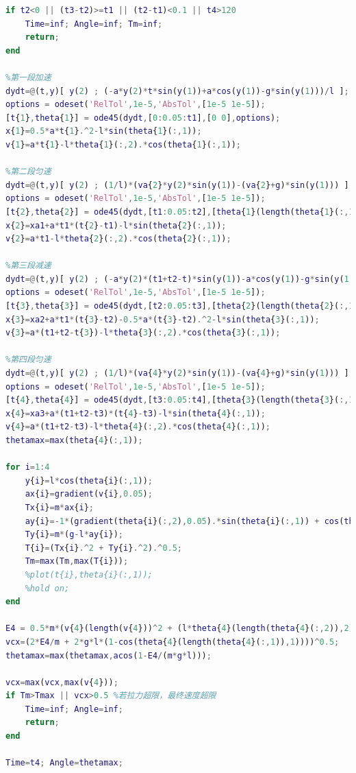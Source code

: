 \documentclass[withoutpreface,bwprint]{cumcmthesis} %
\begin{document}
\begin{appendices}
\begin{lstlisting}[language=matlab]
if t2<0 || (t3-t2)>=t1 || (t2-t1)<0.1 || t4>120
    Time=inf; Angle=inf; Tm=inf;
    return;
end

%第一段加速
dydt=@(t,y)[ y(2) ; (-a*y(2)*t*sin(y(1))+a*cos(y(1))-g*sin(y(1)))/l ];
options = odeset('RelTol',1e-5,'AbsTol',[1e-5 1e-5]);
[t{1},theta{1}] = ode45(dydt,[0:0.05:t1],[0 0],options);
x{1}=0.5*a*t{1}.^2-l*sin(theta{1}(:,1));
v{1}=a*t{1}-l*theta{1}(:,2).*cos(theta{1}(:,1));

%第二段匀速
dydt=@(t,y)[ y(2) ; (1/l)*(va{2}*y(2)*sin(y(1))-(va{2}+g)*sin(y(1))) ];
options = odeset('RelTol',1e-5,'AbsTol',[1e-5 1e-5]);
[t{2},theta{2}] = ode45(dydt,[t1:0.05:t2],[theta{1}(length(theta{1}(:,1)),1) theta{1}(length(theta{1}(:,2)),2)],options);
x{2}=xa1+a*t1*(t{2}-t1)-l*sin(theta{2}(:,1));
v{2}=a*t1-l*theta{2}(:,2).*cos(theta{2}(:,1));

%第三段减速
dydt=@(t,y)[ y(2) ; (-a*y(2)*(t1+t2-t)*sin(y(1))-a*cos(y(1))-g*sin(y(1)))/l ];
options = odeset('RelTol',1e-5,'AbsTol',[1e-5 1e-5]);
[t{3},theta{3}] = ode45(dydt,[t2:0.05:t3],[theta{2}(length(theta{2}(:,1)),1) theta{2}(length(theta{2}(:,2)),2)],options);
x{3}=xa2+a*t1*(t{3}-t2)-0.5*a*(t{3}-t2).^2-l*sin(theta{3}(:,1));
v{3}=a*(t1+t2-t{3})-l*theta{3}(:,2).*cos(theta{3}(:,1));

%第四段匀速
dydt=@(t,y)[ y(2) ; (1/l)*(va{4}*y(2)*sin(y(1))-(va{4}+g)*sin(y(1))) ];
options = odeset('RelTol',1e-5,'AbsTol',[1e-5 1e-5]);
[t{4},theta{4}] = ode45(dydt,[t3:0.05:t4],[theta{3}(length(theta{3}(:,1)),1) theta{3}(length(theta{3}(:,2)),2)],options);
x{4}=xa3+a*(t1+t2-t3)*(t{4}-t3)-l*sin(theta{4}(:,1));
v{4}=a*(t1+t2-t3)-l*theta{4}(:,2).*cos(theta{4}(:,1));
thetamax=max(theta{4}(:,1));

for i=1:4
    y{i}=l*cos(theta{i}(:,1));
    ax{i}=gradient(v{i},0.05);
    Tx{i}=m*ax{i};
    ay{i}=-1*(gradient(theta{i}(:,2),0.05).*sin(theta{i}(:,1)) + cos(theta{i}(:,1)).*theta{i}(:,2).^2);
    Ty{i}=m*(g-l*ay{i});
    T{i}=(Tx{i}.^2 + Ty{i}.^2).^0.5;
    Tm=max(Tm,max(T{i}));
    %plot(t{i},theta{i}(:,1));
    %hold on;
end

E4 = 0.5*m*(v{4}(length(v{4}))^2 + (l*theta{4}(length(theta{4}(:,2)),2)*sin(theta{4}(length(theta{4}(:,1)),1)))^2);
vcx=(2*E4/m + 2*g*l*(1-cos(theta{4}(length(theta{4}(:,1)),1))))^0.5;
thetamax=max(thetamax,acos(1-E4/(m*g*l)));

vcx=max(vcx,max(v{4}));
if Tm>Tmax || vcx>0.5 %若拉力超限，最终速度超限
    Time=inf; Angle=inf;
    return;
end

Time=t4; Angle=thetamax;
     \end{lstlisting}

\end{appendices}
\end{document}

